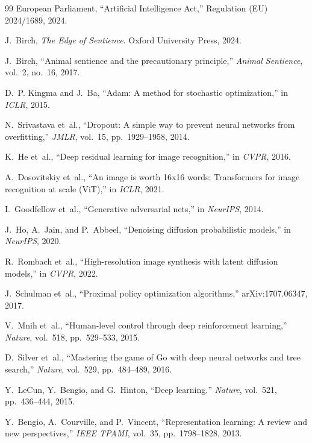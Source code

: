 \begin{thebibliography}{99}
European Parliament, ``Artificial Intelligence Act,'' Regulation (EU)
2024/1689, 2024.

J.~Birch, \emph{The Edge of Sentience}. Oxford University Press, 2024.

J.~Birch, ``Animal sentience and the precautionary principle,''
\emph{Animal Sentience}, vol.~2, no.~16, 2017.

D.~P. Kingma and J.~Ba, ``Adam: A method for stochastic optimization,'' in
\emph{ICLR}, 2015.

N.~Srivastava et~al., ``Dropout: A simple way to prevent neural networks from
overfitting,'' \emph{JMLR}, vol.~15, pp.~1929--1958, 2014.

K.~He et~al., ``Deep residual learning for image recognition,'' in \emph{CVPR},
2016.

A.~Dosovitskiy et~al., ``An image is worth 16x16 words: Transformers for image
recognition at scale (ViT),'' in \emph{ICLR}, 2021.

I.~Goodfellow et~al., ``Generative adversarial nets,'' in \emph{NeurIPS}, 2014.

J.~Ho, A.~Jain, and P.~Abbeel, ``Denoising diffusion probabilistic models,'' in
\emph{NeurIPS}, 2020.

R.~Rombach et~al., ``High-resolution image synthesis with latent diffusion
models,'' in \emph{CVPR}, 2022.

J.~Schulman et~al., ``Proximal policy optimization algorithms,''
arXiv:1707.06347, 2017.

V.~Mnih et~al., ``Human-level control through deep reinforcement learning,''
\emph{Nature}, vol.~518, pp.~529--533, 2015.

D.~Silver et~al., ``Mastering the game of Go with deep neural networks and tree
search,'' \emph{Nature}, vol.~529, pp.~484--489, 2016.

Y.~LeCun, Y.~Bengio, and G.~Hinton, ``Deep learning,'' \emph{Nature},
vol.~521, pp.~436--444, 2015.

Y.~Bengio, A.~Courville, and P.~Vincent, ``Representation learning: A review and
new perspectives,'' \emph{IEEE TPAMI}, vol.~35, pp.~1798--1828, 2013.


\end{thebibliography}
